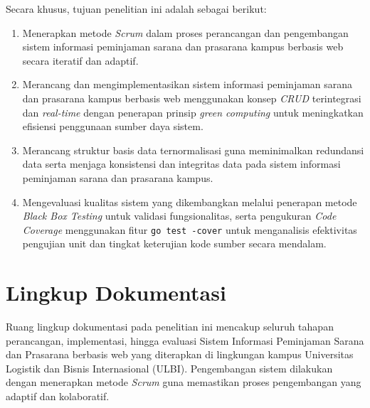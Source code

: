 Secara khusus, tujuan penelitian ini adalah sebagai berikut:
\begin{enumerate}
    \item Menerapkan metode \textit{Scrum} dalam proses perancangan dan pengembangan sistem informasi peminjaman sarana dan prasarana kampus berbasis web secara iteratif dan adaptif.
    \item Merancang dan mengimplementasikan sistem informasi peminjaman sarana dan prasarana kampus berbasis web menggunakan konsep \textit{CRUD} terintegrasi dan \textit{real-time} dengan penerapan prinsip \textit{green computing} untuk meningkatkan efisiensi penggunaan sumber daya sistem.
    \newpage
    \item Merancang struktur basis data ternormalisasi guna meminimalkan redundansi data serta menjaga konsistensi dan integritas data pada sistem informasi peminjaman sarana dan prasarana kampus.
    \item Mengevaluasi kualitas sistem yang dikembangkan melalui penerapan metode \textit{Black Box Testing} untuk validasi fungsionalitas, serta pengukuran \textit{Code Coverage} menggunakan fitur \texttt{go test -cover} untuk menganalisis efektivitas pengujian unit dan tingkat keterujian kode sumber secara mendalam.
\end{enumerate}

\section{Lingkup Dokumentasi}
Ruang lingkup dokumentasi pada penelitian ini mencakup seluruh tahapan perancangan, implementasi, hingga evaluasi Sistem Informasi Peminjaman Sarana dan Prasarana berbasis web yang diterapkan di lingkungan kampus Universitas Logistik dan Bisnis Internasional (ULBI). Pengembangan sistem dilakukan dengan menerapkan metode \textit{Scrum} guna memastikan proses pengembangan yang adaptif dan kolaboratif.

